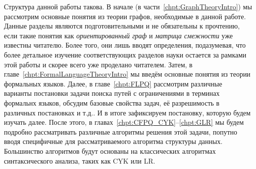 Структура данной работы такова.
В начале (в части~\ref{chpt:GraphTheoryIntro}) мы рассмотрим основные понятия из теории графов, необходимые в данной работе. Данные разделы являются подготовительными и не обязательны к прочтению, если такие понятия как \textit{ориентированный граф} и \textit{матрица смежности} уже известны читателю. Более того, они лишь вводят определения, подазумевая, что более детальное изучение соответствующих разделов науки остается за рамками этой работы и скорее всего уже проделано читателем.
Затем, в главе~\ref{chpt:FormalLanguageTheoryIntro} мы введём основные понятия из теории формальных языков.
Далее, в главе~\ref{chpt:FLPQ} рассмотрим различные варианты постановки задачи поиска путей с ограничениями в терминах формальнх языков, обсудим базовые свойства задач, её разрешимость в различных постановках и т.д..
И в итоге зафиксируем постановку, которую будем изучать далее.
После этого, в главах~\ref{chpt:CFPQ_CYK}--\ref{chpt:GLR} мы будем подробно рассматривать различные алгоритмы решения этой задачи, попутно вводя специфичные для рассматриваемого алгоритма структуры данных.
Большинство алгоритмов будут основаны на классических алгоритмах синтаксического анализа, таких как CYK или LR.
